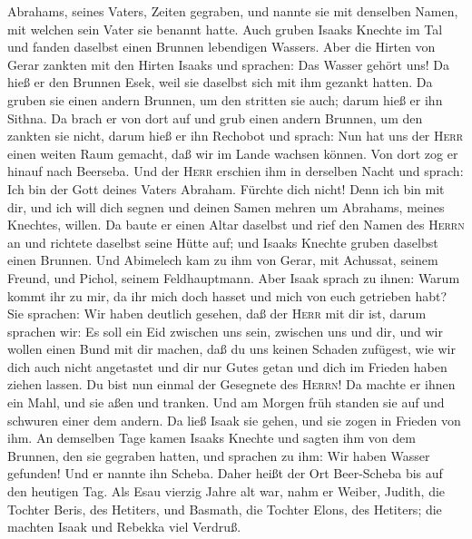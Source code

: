 Abrahams, seines Vaters, Zeiten gegraben, und nannte sie mit denselben
Namen, mit welchen sein Vater sie benannt hatte.  Auch
gruben Isaaks Knechte im Tal und fanden daselbst einen Brunnen
lebendigen Wassers.  Aber die Hirten von Gerar zankten
mit den Hirten Isaaks und sprachen: Das Wasser gehört uns! Da hieß er
den Brunnen Esek, weil sie daselbst sich mit ihm gezankt hatten.
 Da gruben sie einen andern Brunnen, um den stritten sie
auch; darum hieß er ihn Sithna.  Da brach er von dort auf
und grub einen andern Brunnen, um den zankten sie nicht, darum hieß er
ihn Rechobot und sprach: Nun hat uns der \textsc{Herr} einen weiten Raum
gemacht, daß wir im Lande wachsen können.  Von dort zog
er hinauf nach Beerseba.  Und der \textsc{Herr} erschien
ihm in derselben Nacht und sprach: Ich bin der Gott deines Vaters
Abraham. Fürchte dich nicht! Denn ich bin mit dir, und ich will dich
segnen und deinen Samen mehren um Abrahams, meines Knechtes, willen.
 Da baute er einen Altar daselbst und rief den Namen des
\textsc{Herrn} an und richtete daselbst seine Hütte auf; und Isaaks
Knechte gruben daselbst einen Brunnen.  Und Abimelech kam
zu ihm von Gerar, mit Achussat, seinem Freund, und Pichol, seinem
Feldhauptmann.  Aber Isaak sprach zu ihnen: Warum kommt
ihr zu mir, da ihr mich doch hasset und mich von euch getrieben habt?
 Sie sprachen: Wir haben deutlich gesehen, daß der
\textsc{Herr} mit dir ist, darum sprachen wir: Es soll ein Eid zwischen
uns sein, zwischen uns und dir, und wir wollen einen Bund mit dir
machen,  daß du uns keinen Schaden zufügest, wie wir dich
auch nicht angetastet und dir nur Gutes getan und dich im Frieden haben
ziehen lassen. Du bist nun einmal der Gesegnete des \textsc{Herrn}!
 Da machte er ihnen ein Mahl, und sie aßen und tranken.
 Und am Morgen früh standen sie auf und schwuren einer
dem andern. Da ließ Isaak sie gehen, und sie zogen in Frieden von ihm.
 An demselben Tage kamen Isaaks Knechte und sagten ihm
von dem Brunnen, den sie gegraben hatten, und sprachen zu ihm: Wir haben
Wasser gefunden!  Und er nannte ihn Scheba. Daher heißt
der Ort Beer-Scheba bis auf den heutigen Tag.  Als Esau
vierzig Jahre alt war, nahm er Weiber, Judith, die Tochter Beris, des
Hetiters, und Basmath, die Tochter Elons, des Hetiters; 
die machten Isaak und Rebekka viel Verdruß.

